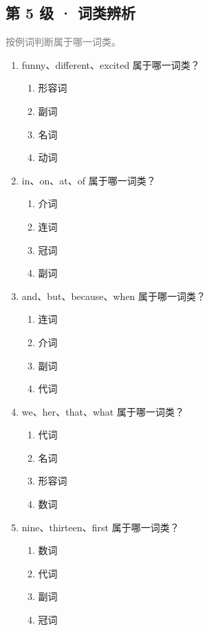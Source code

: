 \documentclass[11pt,a4paper]{ctexart}
\begin{document}
\subsection*{第 5 级 · 词类辨析}
\noindent\textcolor{gray}{按例词判断属于哪一词类。}\par\smallskip
\begin{enumerate}[leftmargin=*,itemsep=4pt]
\item funny、different、excited 属于哪一词类？
\begin{enumerate}[label=\Alph*.,leftmargin=2em,itemsep=1pt,topsep=2pt]
\item 形容词
\item 副词
\item 名词
\item 动词
\end{enumerate}
\item in、on、at、of 属于哪一词类？
\begin{enumerate}[label=\Alph*.,leftmargin=2em,itemsep=1pt,topsep=2pt]
\item 介词
\item 连词
\item 冠词
\item 副词
\end{enumerate}
\item and、but、because、when 属于哪一词类？
\begin{enumerate}[label=\Alph*.,leftmargin=2em,itemsep=1pt,topsep=2pt]
\item 连词
\item 介词
\item 副词
\item 代词
\end{enumerate}
\item we、her、that、what 属于哪一词类？
\begin{enumerate}[label=\Alph*.,leftmargin=2em,itemsep=1pt,topsep=2pt]
\item 代词
\item 名词
\item 形容词
\item 数词
\end{enumerate}
\item nine、thirteen、first 属于哪一词类？
\begin{enumerate}[label=\Alph*.,leftmargin=2em,itemsep=1pt,topsep=2pt]
\item 数词
\item 代词
\item 副词
\item 冠词
\end{enumerate}

\end{enumerate}
\end{document}
